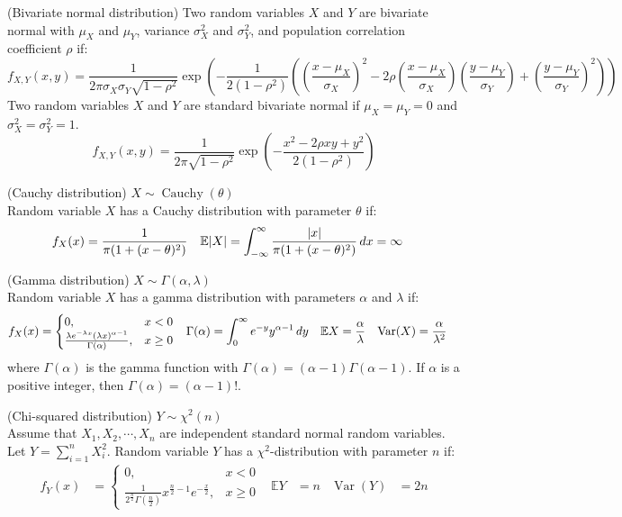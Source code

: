 \documentclass{huhtakm-template-book}
\newcommand{\expect}{\mathbb{E}}
\DeclareMathOperator{\Cauchy}{Cauchy}
\DeclareMathOperator{\Var}{Var}
\begin{document}
\begin{seg}(Bivariate normal distribution)
	Two random variables $X$ and $Y$ are bivariate normal with $\mu_{X}$ and $\mu_{Y}$, variance $\sigma_{X}^{2}$ and $\sigma_{Y}^{2}$, and population correlation coefficient $\rho$ if:
	\begin{equation*}
		f_{X,Y}(x,y)=\frac{1}{2\pi\sigma_{X}\sigma_{Y}\sqrt{1-\rho^{2}}}\exp\left(-\frac{1}{2(1-\rho^{2})}\left(\left(\frac{x-\mu_{X}}{\sigma_{X}}\right)^{2}-2\rho\left(\frac{x-\mu_{X}}{\sigma_{X}}\right)\left(\frac{y-\mu_{Y}}{\sigma_{Y}}\right)+\left(\frac{y-\mu_{Y}}{\sigma_{Y}}\right)^{2}\right)\right)
	\end{equation*}
	Two random variables $X$ and $Y$ are standard bivariate normal if $\mu_{X}=\mu_{Y}=0$ and $\sigma_{X}^{2}=\sigma_{Y}^{2}=1$.
	\begin{equation*}
		f_{X,Y}(x,y)=\frac{1}{2\pi\sqrt{1-\rho^{2}}}\exp\left(-\frac{x^{2}-2\rho xy+y^{2}}{2(1-\rho^{2})}\right)
	\end{equation*}
\end{seg}
\begin{seg}(Cauchy distribution) $X\sim\Cauchy(\theta)$\\
	Random variable $X$ has a Cauchy distribution with parameter $\theta$ if:
	\begin{align*}
		f_{X}(x)&=\frac{1}{\pi(1+(x-\theta)^{2})} & \expect|X|&=\intinfty\frac{|x|}{\pi(1+(x-\theta)^{2})}\,dx=\infty
	\end{align*}
\end{seg}
\begin{seg}(Gamma distribution) $X\sim\Gamma(\alpha,\lambda)$\\
	Random variable $X$ has a gamma distribution with parameters $\alpha$ and $\lambda$ if:
	\begin{align*}
		f_{X}(x)&=\begin{cases}
			0, &x<0\\
			\frac{\lambda e^{-\lambda x}(\lambda x)^{\alpha-1}}{\Gamma(\alpha)}, &x\geq 0
		\end{cases} & \Gamma(\alpha)&=\intlu{0}{\infty}e^{-y}y^{\alpha-1}\,dy & \expect{X}&=\frac{\alpha}{\lambda} & \Var(X)&=\frac{\alpha}{\lambda^{2}}
	\end{align*}
	where $\Gamma(\alpha)$ is the gamma function with $\Gamma(\alpha)=(\alpha-1)\Gamma(\alpha-1)$. If $\alpha$ is a positive integer, then $\Gamma(\alpha)=(\alpha-1)!$.
\end{seg}
\begin{seg}(Chi-squared distribution) $Y\sim\chi^{2}(n)$\\
	Assume that $X_{1},X_{2},\cdots,X_{n}$ are independent standard normal random variables. Let $Y=\sum_{i=1}^{n}X_{i}^{2}$. Random variable $Y$ has a $\chi^{2}$-distribution with parameter $n$ if:
	\begin{align*}
		f_{Y}(x)&=\begin{cases}
			0, &x<0\\
			\frac{1}{2^{\frac{n}{2}}\Gamma(\frac{n}{2})}x^{\frac{n}{2}-1}e^{-\frac{x}{2}}, &x\geq 0
		\end{cases} & \expect{Y}&=n & \Var(Y)&=2n
	\end{align*}
\end{seg}
\end{document}
